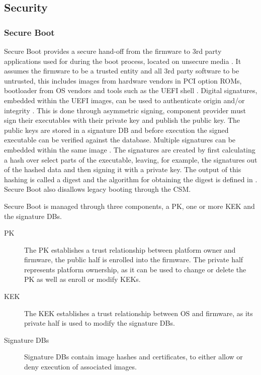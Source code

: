 
\subsection{Security}

\subsubsection{Secure Boot}

Secure Boot provides a secure hand-off from the firmware to 3rd party applications used for during the boot process, located on unsecure media \cite{tianocore-understanding-uefi-secure-boot-chain} \cite[32.2 and 32.5.1]{uefi-spec}.
It assumes the firmware to be a trusted entity and all 3rd party software to be untrusted, this includes images from hardware vendors in \ac{PCI} option \acp{ROM}, bootloader from \ac{OS} vendors and tools such as the \ac{UEFI} shell \cite{tianocore-understanding-uefi-secure-boot-chain}.
Digital signatures, embedded within the \ac{UEFI} images, can be used to authenticate origin and/or integrity \cite[32.2]{uefi-spec}.
This is done through asymmetric signing, component provider must sign their executables with their private key and publish the public key.
The public keys are stored in a signature \ac{DB} and before execution the signed executable can be verified against the database.
Multiple signatures can be embedded within the same image \cite[32.2.2]{uefi-spec}.
The signatures are created by first calculating a hash over select parts of the executable, leaving, for example, the signatures out of the hashed data and then signing it with a private key.
The output of this hashing is called a digest and the algorithm for obtaining the digest is defined in \cite{microsoft-pe-signature-format}.
Secure Boot also disallows legacy booting through the \ac{CSM}.

Secure Boot is managed through three components, a \ac{PK}, one or more \ac{KEK} and the signature \acp{DB}.

\begin{description}
    \item[\ac{PK}]
        The \ac{PK} establishes a trust relationship between platform owner and firmware, the public half is enrolled into the firmware.
        The private half represents platform ownership, as it can be used to change or delete the \ac{PK} as well as enroll or modify \acp{KEK}.
    \item[\ac{KEK}]
        The \ac{KEK} establishes a trust relationship between \ac{OS} and firmware, as its private half is used to modify the signature \acp{DB}.
    \item[Signature \acfp{DB}]
        Signature \acp{DB} contain image hashes and certificates, to either allow or deny execution of associated images.
\end{description}

